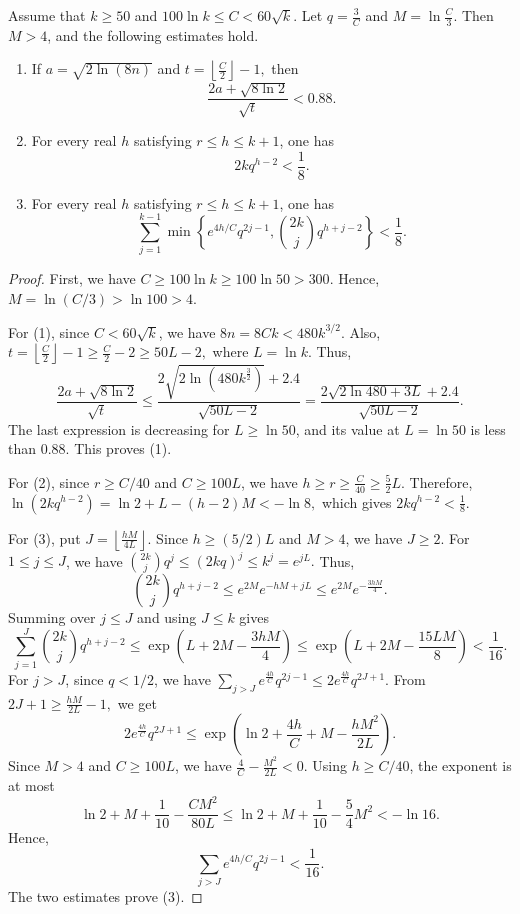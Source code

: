 \documentclass[10pt,a4paper]{amsart}
\begin{document}
\begin{lemma}\label{le5}
Assume that $k\geq 50$ and
$
100\ln k \le C < 60\sqrt{k}.
$
Let
$
q = \frac{3}{C}$ and $M = \ln \frac{C}{3}.
$
Then $M > 4$, and the following estimates hold.

\begin{enumerate}[(1)]
\item If
$
a = \sqrt{2\ln(8n)}$ and $t = \left\lfloor \frac{C}{2} \right\rfloor - 1,
$
then
\[
\frac{2a + \sqrt{8\ln 2}}{\sqrt{t}} < 0.88.
\]

\item For every real $h$ satisfying $r \le h \le k+1$, one has
\[
2k q^{h-2} < \frac{1}{8}.
\]

\item For every real $h$ satisfying $r \le h \le k+1$, one has
\[
\sum_{j=1}^{k-1} \min\left\{ e^{4h/C} q^{2j-1}, \binom{2k}{j} q^{h+j-2} \right\} < \frac{1}{8}.
\]
\end{enumerate}
\end{lemma}

\begin{proof}
First, we have
$
C \ge 100\ln k \ge 100\ln 50 > 300.
$
Hence,
$
M = \ln(C/3) > \ln 100 > 4.
$

For (1), since $C < 60\sqrt{k}$, we have
$
8n = 8Ck < 480k^{3/2}.
$
Also,
$
t = \left\lfloor \frac{C}{2} \right\rfloor - 1 \ge \frac{C}{2} - 2 \ge 50L - 2,
$
where $L = \ln k$. 
Thus,
$$
\frac{2a + \sqrt{8\ln 2}}{\sqrt{t}}
\le \frac{2\sqrt{2\ln(480k^{\frac{3}{2}})} + 2.4}{\sqrt{50L - 2}}
= \frac{2\sqrt{2\ln 480 + 3L} + 2.4}{\sqrt{50L - 2}}.
$$
The last expression is decreasing for $L \ge \ln 50$, and its value at $L = \ln 50$ is less than $0.88$. This proves (1).

For (2), since $r \ge C/40$ and $C \ge 100L$, we have
$
h \ge r \ge \frac{C}{40} \ge \frac{5}{2}L.
$
Therefore,
$
\ln(2k q^{h-2}) = \ln 2 + L - (h-2)M < -\ln 8,
$
which gives $2k q^{h-2} < \frac{1}{8}$.

For (3), put
$
J = \left\lfloor \frac{hM}{4L} \right\rfloor.
$
Since $h \ge (5/2)L$ and $M > 4$, we have $J \ge 2$.
For $1 \le j \le J$, we have
$
\binom{2k}{j} q^j \le (2kq)^j \le k^j = e^{jL}.
$
Thus,
$$
\binom{2k}{j} q^{h+j-2} \le e^{2M} e^{-hM + jL} \le e^{2M} e^{-\frac{3hM}{4}}.
$$
Summing over $j \le J$ and using $J \le k$ gives
$$
\sum_{j=1}^{J} \binom{2k}{j} q^{h+j-2}
\le \exp\left( L + 2M - \frac{3hM}{4} \right)
\le \exp\left( L + 2M - \frac{15LM}{8} \right)
< \frac{1}{16}.
$$
For  $j > J$, since $q < 1/2$, we have
$
\sum_{j > J} e^{\frac{4h}{C}} q^{2j-1} \le 2 e^{\frac{4h}{C}} q^{2J+1}.
$
From
$
2J+1 \ge \frac{hM}{2L} - 1,
$
we get
$$
2 e^{\frac{4h}{C}} q^{2J+1}
\le \exp\left( \ln 2 + \frac{4h}{C} + M - \frac{hM^2}{2L} \right).
$$
Since $M > 4$ and $C \ge 100L$, we have
$
\frac{4}{C} - \frac{M^2}{2L} < 0.
$
Using $h \ge C/40$, the exponent is at most
$$
\ln 2 + M + \frac{1}{10} - \frac{CM^2}{80L}
\le \ln 2 + M + \frac{1}{10} - \frac{5}{4}M^2
< -\ln 16.
$$
Hence,
$$
\sum_{j > J} e^{4h/C} q^{2j-1} < \frac{1}{16}.
$$
The two estimates prove (3).
\end{proof}
\end{document}
